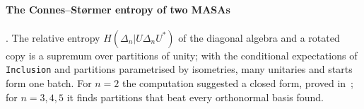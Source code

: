 \paragraph{The Connes--St{\o}rmer entropy of two MASAs}\label{sec:cs} \cite{nn_cs}. The relative entropy
$H(\Delta_n|U\Delta_nU^*)$ of the diagonal algebra and a rotated copy is a supremum over partitions of unity; with the
conditional expectations of \texttt{Inclusion} and partitions parametrised by isometries, many unitaries and starts form
one batch. For $n=2$ the computation suggested a closed form, proved in~\cite{nn_cs}; for $n=3,4,5$ it finds partitions
that beat every orthonormal basis found.
